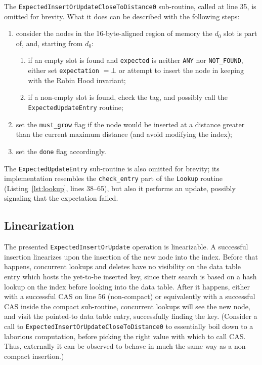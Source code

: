 The \texttt{ExpectedInsertOrUpdateCloseToDistance0} sub-routine, called at line 35, is omitted for brevity.
What it does can be described with the following steps:
\begin{enumerate}
    \item consider the nodes in the 16-byte-aligned region of memory the $d_0$ slot is part of, and, starting from $d_0$:
    \begin{enumerate}
        \item if an empty slot is found and \texttt{expected} is neither \texttt{ANY} nor \texttt{{NOT\_FOUND}}, either set \texttt{expectation} $=\bot$ or attempt to insert the node in keeping with the Robin Hood invariant;
        \item if a non-empty slot is found, check the tag, and possibly call the \texttt{ExpectedUpdateEntry} routine;
    \end{enumerate}
    \item set the \texttt{{must\_grow}} flag if the node would be inserted at a distance greater than the current maximum distance (and avoid modifying the index);
    \item set the \texttt{done} flag accordingly.
\end{enumerate}

The \texttt{ExpectedUpdateEntry} sub-routine is also omitted for brevity; its implementation resembles the \texttt{{check\_entry}} part of the \texttt{Lookup} routine (Listing~\ref{lst:lookup}, lines 38--65), but also it performs an update, possibly signaling that the expectation failed.

\subsection{Linearization}\label{subsec:insert-linearization}

The presented \texttt{ExpectedInsertOrUpdate} operation is linearizable.
A successful insertion linearizes upon the insertion of the new node into the index.
Before that happens, concurrent lookups and deletes have no visibility on the data table entry which hosts the yet-to-be inserted key, since their search is based on a hash lookup on the index before looking into the data table.
After it happens, either with a successful CAS on line 56 (non-compact) or equivalently with a successful CAS inside the compact sub-routine, concurrent lookups will see the new node, and visit the pointed-to data table entry, successfully finding the key.
(Consider a call to \texttt{ExpectedInsertOrUpdateCloseToDistance0} to essentially boil down to a laborious computation, before picking the right value with which to call CAS\@.
Thus, externally it can be observed to behave in much the same way as a non-compact insertion.)

